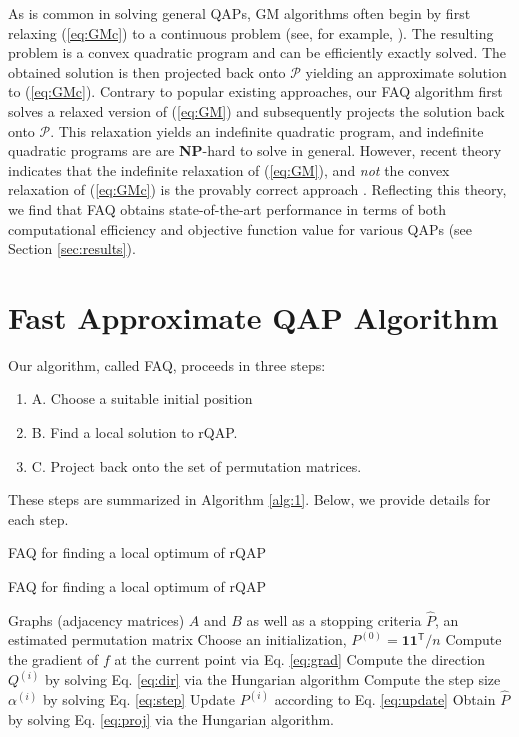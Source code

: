 \documentclass[10pt]{article}
\providecommand{\mc}[1]{\mathcal{#1}}
\providecommand{\mb}[1]{\boldsymbol{#1}}
\providecommand{\wh}[1]{\widehat{#1}}
\providecommand{\mc}[1]{\mathcal{#1}}
\providecommand{\mb}[1]{\boldsymbol{#1}}
\providecommand{\wh}[1]{\widehat{#1}}
\newcommand{\T}{^{\ensuremath{\mathsf{T}}}}
\begin{document}
As is common in solving general QAPs, GM algorithms often begin by first relaxing (\ref{eq:GMc}) to a continuous problem (see, for example, \cite{Zaslavskiy2009}).  The resulting problem is a convex quadratic program and can be efficiently exactly solved.  The obtained solution is then projected back onto $\mc{P}$ yielding an approximate solution to (\ref{eq:GMc}).  Contrary to popular existing approaches, our FAQ algorithm first solves a relaxed version of (\ref{eq:GM}) and subsequently projects the solution back onto $\mc{P}$.  
This relaxation yields an indefinite quadratic program, and indefinite quadratic programs are are {\bf NP}-hard to solve in general.  
However, recent theory indicates that the indefinite relaxation of (\ref{eq:GM}), and {\it not} the convex relaxation of (\ref{eq:GMc}) is the provably correct approach \cite{lyzinski2014graph}.
Reflecting this theory, we find that FAQ obtains state-of-the-art performance in terms of both computational efficiency and objective function value for various QAPs (see Section \ref{sec:results}).



\section{Fast Approximate QAP Algorithm} 
\label{sec:FAQ}


Our algorithm, called FAQ, proceeds in three steps:
\begin{enumerate}
	\item[] A. Choose a suitable initial position
	\item[] B. Find a local solution to rQAP. 
	\item[] C. Project back onto the set of permutation matrices. 
\end{enumerate}

These steps are summarized in Algorithm \ref{alg:1}.  Below, we provide details for each step.

\begin{algorithm}
	\caption*{FAQ for finding a local optimum of rQAP} 
\begin{algorithmic}[1]
\caption{FAQ for finding a local optimum of rQAP} \label{alg:1}
	\REQUIRE Graphs (adjacency matrices) $A$ and $B$ as well as a stopping criteria
	\ENSURE $\wh{P}$, an estimated permutation matrix
	\STATE Choose an initialization, $P^{(0)}=\mb{1}\mb{1}\T/n$ \label{step:init} 
	\STATE Compute the gradient of $f$ at the current point via Eq. \eqref{eq:grad}	
	\STATE Compute the direction $Q^{(i)}$ by solving Eq. \eqref{eq:dir} via the Hungarian algorithm
	\STATE Compute the step size $\alpha^{(i)}$ by solving Eq. \eqref{eq:step}
	\STATE Update $P^{(i)}$ according to Eq. \eqref{eq:update}  %
	\ENDWHILE
	\STATE Obtain $\wh{P}$ by solving Eq. \eqref{eq:proj} via the Hungarian algorithm.
\end{algorithmic}
\end{algorithm}
\end{document}
